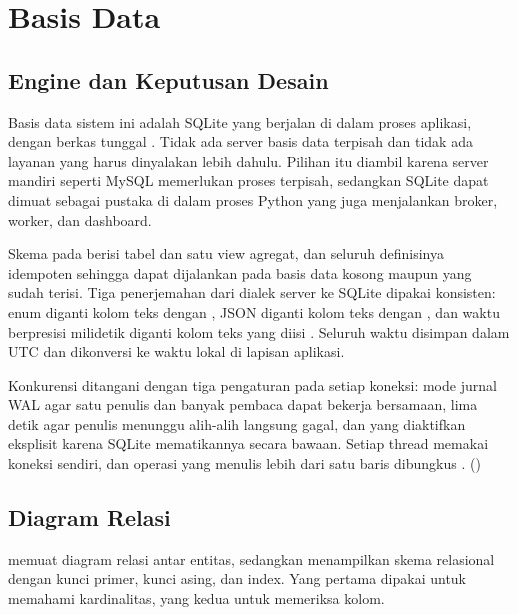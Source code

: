 \chapter{Basis Data}
\label{ch:07-basis-data}

\section{Engine dan Keputusan Desain}

Basis data sistem ini adalah SQLite yang berjalan di dalam proses aplikasi, dengan
berkas tunggal \code{\DbFile}. Tidak ada server basis data terpisah dan tidak ada
layanan yang harus dinyalakan lebih dahulu. Pilihan itu diambil karena server
mandiri seperti MySQL memerlukan proses terpisah, sedangkan SQLite dapat dimuat
sebagai pustaka di dalam proses Python yang juga menjalankan broker, worker, dan
dashboard.

Skema pada  berisi \NumTables{} tabel dan satu view
agregat, dan seluruh definisinya idempoten sehingga dapat dijalankan pada basis data
kosong maupun yang sudah terisi. Tiga penerjemahan dari dialek server ke SQLite
dipakai konsisten: enum diganti kolom teks dengan , JSON diganti kolom
teks dengan , dan waktu berpresisi milidetik diganti kolom teks
yang diisi . Seluruh waktu disimpan dalam UTC dan dikonversi ke waktu
lokal di lapisan aplikasi.

Konkurensi ditangani dengan tiga pengaturan pada setiap koneksi: mode jurnal WAL
agar satu penulis dan banyak pembaca dapat bekerja bersamaan, 
lima detik agar penulis menunggu alih-alih langsung gagal, dan 
yang diaktifkan eksplisit karena SQLite mematikannya secara bawaan. Setiap thread
memakai koneksi sendiri, dan operasi yang menulis lebih dari satu baris dibungkus
. ()

\section{Diagram Relasi}

 memuat diagram relasi antar entitas, sedangkan
 menampilkan skema relasional dengan kunci primer,
kunci asing, dan index. Yang pertama dipakai untuk memahami kardinalitas, yang kedua
untuk memeriksa kolom.


